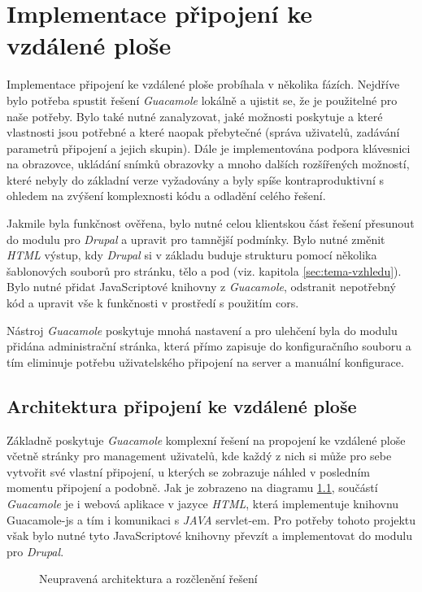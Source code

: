 \chapter{Implementace připojení ke vzdálené ploše}
\label{chap:implementace-guacamole}
Implementace připojení ke vzdálené ploše probíhala v několika fázích. Nejdříve bylo potřeba spustit řešení \emph{Guacamole} lokálně a ujistit se, že je použitelné pro naše potřeby. Bylo také nutné zanalyzovat, jaké možnosti poskytuje a které vlastnosti jsou potřebné a které naopak přebytečné (správa uživatelů, zadávání parametrů připojení a jejich skupin). Dále je implementována podpora klávesnici na obrazovce, ukládání snímků obrazovky a mnoho dalších rozšířených možností, které nebyly do základní verze vyžadovány a byly spíše kontraproduktivní s ohledem na zvýšení komplexnosti kódu a odladění celého řešení. 

Jakmile byla funkčnost ověřena, bylo nutné celou klientskou část řešení přesunout do modulu pro \emph{Drupal} a upravit pro tamnější podmínky. Bylo nutné změnit \emph{HTML} výstup, kdy \emph{Drupal} si v základu buduje strukturu pomocí několika šablonových souborů pro stránku, tělo a pod (viz. kapitola \ref{sec:tema-vzhledu}). Bylo nutné přidat JavaScriptové knihovny z \emph{Guacamole}, odstranit nepotřebný kód a upravit vše k funkčnosti v prostředí s použitím \gls{cors}. 

Nástroj \emph{Guacamole} poskytuje mnohá nastavení a pro ulehčení byla do modulu přidána administrační stránka, která přímo zapisuje do konfiguračního souboru a tím eliminuje potřebu uživatelského připojení na server a manuální konfigurace. 


\section{Architektura připojení ke vzdálené ploše}
Základně poskytuje \emph{Guacamole} komplexní řešení na propojení ke vzdálené ploše včetně stránky pro management uživatelů, kde každý z nich si může pro sebe vytvořit své vlastní připojení, u kterých se zobrazuje náhled v posledním momentu připojení a podobně. Jak je zobrazeno na diagramu \ref{fig:arch_guacamole}, součástí \emph{Guacamole} je i webová aplikace v jazyce \emph{HTML}, která implementuje knihovnu Guacamole-js a tím i komunikaci s \emph{JAVA} \gls{servlet}-em. Pro potřeby tohoto projektu však bylo nutné tyto JavaScriptové knihovny převzít a implementovat do modulu pro \emph{Drupal}. 

\begin{figure}[htp] 
  \caption{Neupravená architektura a rozčlenění řešení}
  \label{fig:arch_guacamole}
\end{figure}  

